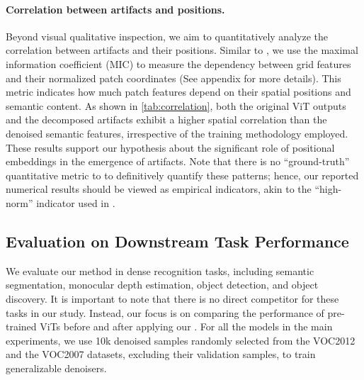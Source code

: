 \paragraph{Correlation between artifacts and positions.} Beyond visual qualitative inspection, we aim to quantitatively analyze the correlation between artifacts and their positions. Similar to \cite{voita2023neurons}, we use the maximal information coefficient (MIC) to measure the dependency between grid features and their normalized patch coordinates (See appendix for more details). This metric indicates how much patch features depend on their spatial positions and semantic content. As shown in \cref{tab:correlation}, both the original ViT outputs and the decomposed artifacts exhibit a higher spatial correlation than the denoised semantic features, irrespective of the training methodology employed. These results support our hypothesis about the significant role of positional embeddings in the emergence of artifacts. Note that there is no ``ground-truth'' quantitative metric to to definitively quantify these patterns; hence, our reported numerical results should be viewed as empirical indicators, akin to the ``high-norm'' indicator used in \cite{darcet2023vision}.


\subsection{Evaluation on Downstream Task Performance}

We evaluate our method in dense recognition tasks, including semantic segmentation, monocular depth estimation, object detection, and object discovery. It is important to note that there is no direct competitor for these tasks in our study. Instead, our focus is on comparing the performance of pre-trained ViTs before and after applying our \ours. For all the models in the main experiments, we use 10k denoised samples randomly selected from the VOC2012 and the VOC2007 datasets, excluding their validation samples, to train generalizable denoisers.

